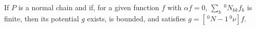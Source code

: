 If $P$ is a normal chain and if, for a given function $f$ with $\alpha f = 0$, $\sum_k \,^0N_{kk} f_k$ is finite, then its potential $g$ exists, is bounded, and satisfies $g = [\,^0N - 1 \,^0\nu] f$.